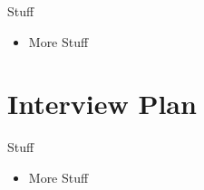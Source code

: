 \documentclass[10pt]{beamer}
\begin{document}

\begin{frame}{Stuff}
	\begin{itemize}
        \pause{}
		\item More Stuff
	\end{itemize}	
\end{frame}


\section{Interview Plan}


\begin{frame}{Stuff}
	\begin{itemize}
        \pause{}
		\item More Stuff
	\end{itemize}	
\end{frame}

 
  

\end{document}
